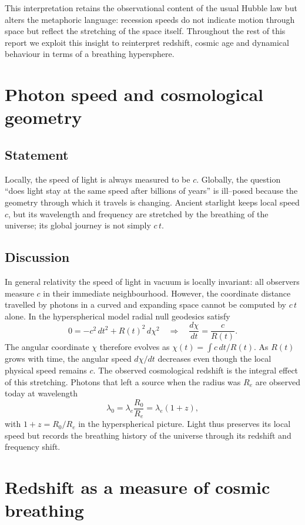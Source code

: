 \documentclass{article}
\begin{document}
This interpretation retains the observational content of the usual Hubble law but alters the metaphoric language: recession speeds do not indicate motion through space but reflect the stretching of the space itself.  Throughout the rest of this report we exploit this insight to reinterpret redshift, cosmic age and dynamical behaviour in terms of a breathing hypersphere.

\section{Photon speed and cosmological geometry}
\label{sec:speed}
\subsection{Statement}
Locally, the speed of light is always measured to be $c$.  Globally, the question ``does light stay at the same speed after billions of years'' is ill–posed because the geometry through which it travels is changing.  Ancient starlight keeps local speed $c$, but its wavelength and frequency are stretched by the breathing of the universe; its global journey is not simply $c\,t$.

\subsection{Discussion}
In general relativity the speed of light in vacuum is locally invariant: all observers measure $c$ in their immediate neighbourhood.  However, the coordinate distance travelled by photons in a curved and expanding space cannot be computed by $c\,t$ alone.  In the hyperspherical model radial null geodesics satisfy
\[
0 = -c^2\,dt^2 + R(t)^2\,d\chi^2 \quad \Rightarrow \quad \frac{d\chi}{dt} = \frac{c}{R(t)}.
\]
The angular coordinate $\chi$ therefore evolves as $\chi(t) = \int c\,dt/R(t)$.  As $R(t)$ grows with time, the angular speed $d\chi/dt$ decreases even though the local physical speed remains $c$.  The observed cosmological redshift is the integral effect of this stretching.  Photons that left a source when the radius was $R_e$ are observed today at wavelength
\[
\lambda_0 = \lambda_e \frac{R_0}{R_e} = \lambda_e (1+z),
\]
with $1+z=R_0/R_e$ in the hyperspherical picture.  Light thus preserves its local speed but records the breathing history of the universe through its redshift and frequency shift.

\section{Redshift as a measure of cosmic breathing}
\label{sec:redshift}
\end{document}
